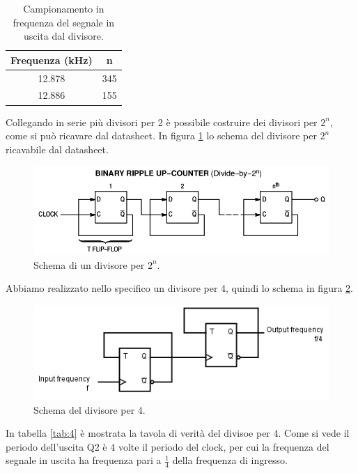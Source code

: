\documentclass[journal, a4paper]{IEEEtran}
\begin{document}
\begin{table}[htp]
\centering
\caption{Campionamento in frequenza del segnale in uscita dal divisore.}
\label{tab:div}
\begin{tabular}{|c|c|}
\hline 
Frequenza (kHz) & n \\ 
\hline 
12.878 & 345 \\ 
\hline 
12.886 & 155 \\ 
\hline 
\end{tabular} 
\end{table}

Collegando in serie più divisori per 2 è possibile costruire dei divisori per $2^n$, come si può ricavare dal datasheet. In figura \ref{fig:divider} lo schema del divisore per $2^n$ ricavabile dal datasheet.

\begin{figure}[htp]
\centering
\includegraphics[scale=.3]{divider}
\caption{Schema di un divisore per $2^n$.}
\label{fig:divider}
\end{figure}

Abbiamo realizzato nello specifico un divisore per 4, quindi lo schema in figura \ref{fig:div4}.

\begin{figure}[htp]
\centering
\includegraphics[scale=.4]{divider4}
\caption{Schema del divisore per 4.}
\label{fig:div4}
\end{figure}

In tabella \ref{tab:4} è mostrata la tavola di verità del divisoe per 4. Come si vede il periodo dell'uscita Q2 è 4 volte il periodo del clock, per cui la frequenza del segnale in uscita ha frequenza pari a $\frac{1}{4}$ della frequenza di ingresso.
\end{document}
